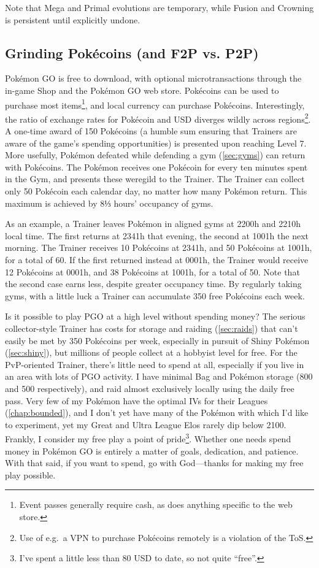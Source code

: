 Note that Mega and Primal evolutions are temporary, while Fusion and Crowning is persistent
  until explicitly undone.
\subsection{Grinding Pokécoins (and F2P vs. P2P)\label{subsec:getcoins}}
Pokémon GO is free to download, with optional microtransactions through the in-game
  Shop and the Pokémon GO web store.
Pokécoins can be used to purchase most items\footnote{Event passes generally require cash,
  as does anything specific to the web store.}, and local currency can purchase Pokécoins.
Interestingly, the ratio of exchange rates for Pokécoin and USD diverges
  wildly across regions\footnote{Use of e.g.\ a VPN to purchase Pokécoins remotely is a violation of the ToS\@.}.
A one-time award of 150 Pokécoins (a humble sum ensuring that Trainers are aware of the game's spending opportunities)
  is presented upon reaching Level 7.
More usefully, Pokémon defeated while defending a gym (\autoref{sec:gyms}) can
  return with Pokécoins.
The Pokémon receives one Pokécoin for every ten minutes spent in the Gym, and presents these weregild to the Trainer.
The Trainer can collect only 50 Pokécoin each calendar day, no matter how many Pokémon return.
This maximum is achieved by 8⅓ hours' occupancy of gyms.

As an example, a Trainer leaves Pokémon in aligned gyms at 2200h and 2210h local time.
The first returns at 2341h that evening, the second at 1001h the next morning.
The Trainer receives 10 Pokécoins at 2341h, and 50 Pokécoins at 1001h, for a total of 60.
If the first returned instead at 0001h, the Trainer would receive 12 Pokécoins at 0001h,
  and 38 Pokécoins at 1001h, for a total of 50.
Note that the second case earns less, despite greater occupancy time.
By regularly taking gyms, with a little luck a Trainer can accumulate 350 free Pokécoins each week.

Is it possible to play PGO at a high level without spending money?
The serious collector-style Trainer has costs for storage and raiding (\autoref{sec:raids})
  that can't easily be met by 350 Pokécoins per week, especially
  in pursuit of Shiny Pokémon (\autoref{sec:shiny}),
  but millions of people collect at a hobbyist level for free.
For the PvP-oriented Trainer, there's little need to spend at all,
  especially if you live in an area with lots of PGO activity.
I have minimal Bag and Pokémon storage (800 and 500 respectively), and raid almost exclusively locally using the daily free pass.
Very few of my Pokémon have the optimal IVs for their Leagues (\autoref{chap:bounded}),
  and I don't yet have many of the Pokémon with which I'd like to experiment,
  yet my Great and Ultra League Elos rarely dip below 2100.
Frankly, I consider my free play a point of pride\footnote{I've spent a little less than 80 USD to date, so not quite ``free''.}.
Whether one needs spend money in Pokémon GO is entirely a matter of goals, dedication, and patience.
With that said, if you want to spend, go with God---thanks for making my free play possible.

